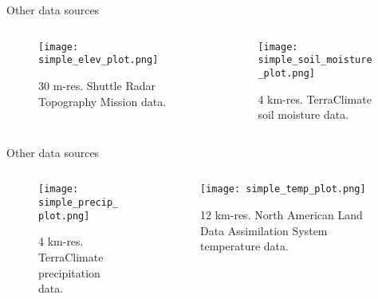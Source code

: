 \documentclass[aspectratio=169]{beamer}
\begin{document}
\begin{frame}{Other data sources}
\begin{columns}
\begin{column}{0.48\linewidth}
    \begin{figure}[h]
    \centering
    \texttt{[image: simple\_elev\_plot.png]}
    \small
    \caption{30 m-res. Shuttle Radar Topography Mission data.}
    \label{fig:simple_elev_plot}
    \end{figure}
\end{column}

\begin{column}{0.48\linewidth}
    \begin{figure}[h]
    \centering
    \texttt{[image: simple\_soil\_moisture\_plot.png]}
    \small
    \caption{4 km-res. TerraClimate soil moisture data.}
    \label{fig:simple_precip_plot}
    \end{figure}
\end{column}
\end{columns}
\end{frame}

\begin{frame}{Other data sources}
\begin{columns}
\begin{column}{0.48\linewidth}
    \begin{figure}[h]
    \centering
    \texttt{[image: simple\_precip\_plot.png]}
    \small
    \caption{4 km-res. TerraClimate precipitation data.}
    \label{fig:simple_precip_plot}
    \end{figure}
\end{column}
\begin{column}{0.48\linewidth}
\begin{figure}[h]
    \centering
    \texttt{[image: simple\_temp\_plot.png]}
    \small
    \caption{12 km-res. North American Land Data Assimilation System temperature data.}
    \label{fig:simple_temp_plot}
    \end{figure}
\end{column}
\end{columns}
    
\end{frame}
\end{document}
